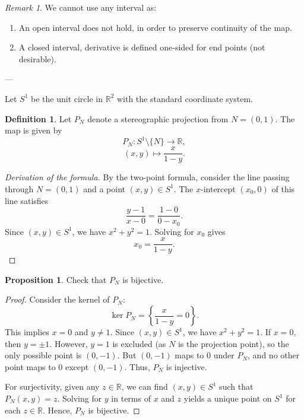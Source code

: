 \documentclass[11pt]{article}
\theoremstyle{definition}
\newtheorem{definition}{Definition}[section]
\newtheorem{proposition}{Proposition}[section]
\theoremstyle{remark}
\newtheorem{remark}{Remark}[section]
\begin{document}
\begin{remark}
We cannot use any interval as:
\begin{enumerate}
    \item An open interval does not hold, in order to preserve continuity of the map.
    \item A closed interval, derivative is defined one-sided for end points (not desirable).
\end{enumerate}
\end{remark}

---

Let $S^1$ be the unit circle in $\mathbb{R}^2$ with the standard coordinate system.

\begin{definition}\label{def:stereographic_projection}
Let $P_N$ denote a stereographic projection from $N = (0, 1)$.
The map is given by
\[
P_N \colon S^1 \setminus \{N\} \to \mathbb{R},
\]
\[
(x, y) \mapsto \frac{x}{1 - y}.
\]
\end{definition}

\begin{proof}[Derivation of the formula]
By the two-point formula, consider the line passing through $N = (0, 1)$ and a point $(x, y) \in S^1$. The $x$-intercept $(x_0, 0)$ of this line satisfies
\[
\frac{y - 1}{x - 0} = \frac{1 - 0}{0 - x_0}.
\]
Since $(x, y) \in S^1$, we have $x^2 + y^2 = 1$. Solving for $x_0$ gives
\[
x_0 = \frac{x}{1 - y}.
\]
\end{proof}

\begin{proposition}\label{prop:bijective_projection}
Check that $P_N$ is bijective.
\end{proposition}

\begin{proof}
Consider the kernel of $P_N$:
\[
\ker P_N = \left\{ \frac{x}{1 - y} = 0 \right\}.
\]
This implies $x = 0$ and $y \neq 1$. Since $(x, y) \in S^1$, we have $x^2 + y^2 = 1$. If $x = 0$, then $y = \pm 1$. However, $y = 1$ is excluded (as $N$ is the projection point), so the only possible point is $(0, -1)$. But $(0, -1)$ maps to $0$ under $P_N$, and no other point maps to $0$ except $(0, -1)$. Thus, $P_N$ is injective.

For surjectivity, given any $z \in \mathbb{R}$, we can find $(x, y) \in S^1$ such that $P_N(x, y) = z$. Solving for $y$ in terms of $x$ and $z$ yields a unique point on $S^1$ for each $z \in \mathbb{R}$. Hence, $P_N$ is bijective.
\end{proof}
\end{document}
